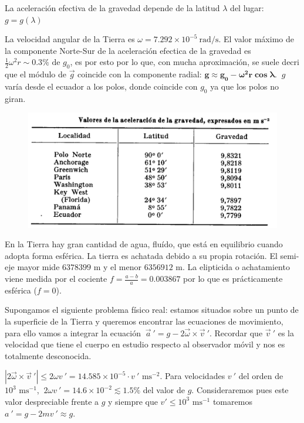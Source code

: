La aceleración efectiva de la gravedad depende de la latitud $\lambda$ del lugar: $g=g(\lambda)$

La velocidad angular de la Tierra es $\omega=7.292\times 10^{-5} \ \mathrm{rad/s}$. El valor máximo de la componente Norte-Sur de la aceleración efectica de la gravedad es  $\frac 1 2 \omega^2 r \sim 0.3\%  \text{ de } g_0$, es por esto por lo que, con mucha aproximación, se suele decri que el módulo de $\vec g$ coincide con la componente radial: $\boldsymbol{ g\approx g_0-\omega^2r\cos \lambda }$. $\ g\ $ varía  desde el ecuador a los polos, donde coincide con $g_0$ ya que los polos no giran.

\begin{figure}[H]
	\centering
	\includegraphics[width=1\textwidth]{imagenes/imagenes11/T11IM07.png}
\end{figure}

En la Tierra hay gran cantidad de agua, fluído, que está en equilibrio cuando adopta forma esférica. La tierra es achatada debido a su propia rotación. El semi-eje mayor mide $6378399 \text{ m}$ y el menor $6356912\text{ m}$. La elipticida o achatamiento viene medida por el cociente $f=\frac{a-b}{a}=0.003867$ por lo que es prácticamente esférica ($f=0$).

Supongamos el siguiente problema físico real: estamos situados sobre un punto de la superficie de la Tierra y queremos encontrar las ecuaciones de movimiento, para ello vamos a integrar la ecuación
$\ \vec a\ '=g-2\vec \omega \times \vec v\ '$. Recordar que $\vec v\ '$ es la velocidad que tiene el cuerpo en estudio respecto al observador móvil y nos es totalmente desconocida.

$|2\vec \omega \times \vec v\ '| \leqslant 2\omega v\ '=14.585\times 10^{-5}\cdot v\ ' \text{ ms}^{-2}$.  Para velocidades $v\ '$ del orden de $10^3 \text{ ms}^{-1}$, $\ 2\omega v\ ' = 14.6\times 10^{-2} \lesssim  1.5\%$ del valor de $g$. Consideraremos pues este valor despreciable frente a $g$ y siempre que $v ' \leq 10^3 \text{ ms}^{-1}$ tomaremos $a\ '= g - 2mv\ ' \approx g$.

